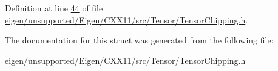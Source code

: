 Definition at line \hyperlink{eigen_2unsupported_2_eigen_2_c_x_x11_2src_2_tensor_2_tensor_chipping_8h_source_l00044}{44} of file \hyperlink{eigen_2unsupported_2_eigen_2_c_x_x11_2src_2_tensor_2_tensor_chipping_8h_source}{eigen/unsupported/\+Eigen/\+C\+X\+X11/src/\+Tensor/\+Tensor\+Chipping.\+h}.



The documentation for this struct was generated from the following file\+:\begin{DoxyCompactItemize}
\item 
eigen/unsupported/\+Eigen/\+C\+X\+X11/src/\+Tensor/\+Tensor\+Chipping.\+h\end{DoxyCompactItemize}
